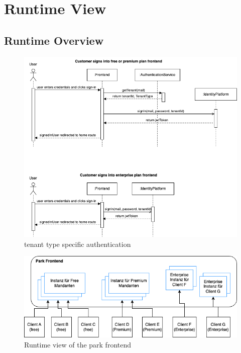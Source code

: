 \section{Runtime View}
\subsection{Runtime Overview}

\begin{figure}[ht]
  \centering
  \includegraphics[width=\textwidth]{resources/03-runtime-view/03-authentication-sequence.drawio.png}
  \caption{tenant type specific authentication}
  \label{fig:authentication-sequence}
\end{figure}

\begin{figure}[ht]
  \centering
  \includegraphics[width=\textwidth]{resources/03-runtime-view/park-frontend.png}
  \caption{Runtime view of the park frontend}
  \label{fig:03-park-frontend}
\end{figure}

